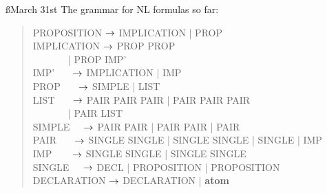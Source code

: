 \documentclass[a4paper]{article}
\begin{document}
\ss{March 31st}
The grammar for NL formulas so far:
\begin{quote}
\ttfamily
PROPOSITION $\rightarrow$ IMPLICATION | PROP\\
IMPLICATION $\rightarrow$  PROP  PROP\\
\(~~~~~~~~~~~~~~~\) |
 PROP  IMP'\\
IMP' \(~~~~~~~\)$\rightarrow$ IMPLICATION | IMP \\
PROP \(~~~~~~~\)$\rightarrow$ SIMPLE | LIST \\
LIST \(~~~~~~~\)$\rightarrow$ PAIR\txt{, } PAIR PAIR |
                      PAIR\txt{, } PAIR PAIR\\
\(~~~~~~~~~~~~~~~\) | PAIR\txt{, } LIST\\
SIMPLE \(~~~~~\)$\rightarrow$ PAIR  PAIR |
                      PAIR  PAIR  | PAIR\\
PAIR \(~~~~~~~\)$\rightarrow$ SINGLE   SINGLE | SINGLE  SINGLE
                    | SINGLE | IMP\\
IMP \(~~~~~~~~\)$\rightarrow$ SINGLE  SINGLE
                    | SINGLE  SINGLE\\
SINGLE \(~~~~~\)$\rightarrow$ DECL | PROPOSITION |
                      PROPOSITION\\
DECLARATION $\rightarrow$ DECLARATION | \bf{atom}\\
\end{quote}
\end{document}
